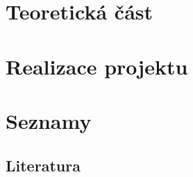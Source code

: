 \documentclass{template/socthesis}
\begin{document}
	
	
	
	\chapter{Teoretická část}
	\label{chap:teoretical-part}
	
	
	
	

	
	
	\chapter{Realizace projektu}
	\label{chap:practical-part}
	
	
	
	
	
	
	
	
	
	
	
	
	
	\chapter*{Seznamy}
	
	\section*{Literatura}
	\printbibliography[title=Literatura]
	
	\listoffigures
	
	
	
	\printglossaries

	
\end{document}
